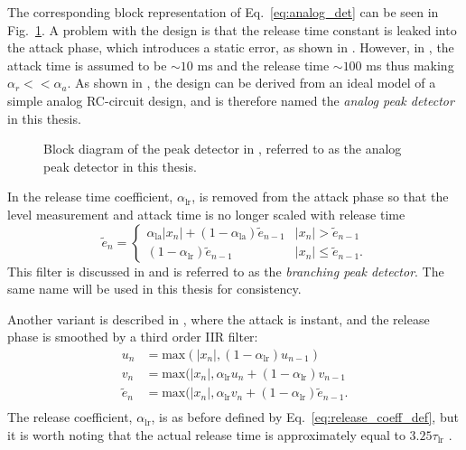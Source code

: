 \documentclass[../main2.tex]{subfiles}
\providecommand{\rootdir}{..}
\begin{document}
The corresponding block representation of Eq.~\eqref{eq:analog_det} can be seen in Fig.~\ref{fig:block_mcnally_theory_peak}. A problem with the design is that the release time constant is leaked into the attack phase, which introduces a static error, as shown in \cite{reiss2012tutorial}. However, in \cite{mcnally1984dynamic}, the attack time is assumed to be $\sim 10$ ms and the release time   $\sim 100$ ms thus making $\alpha_r << \alpha_a$. As shown in \cite{reiss2012tutorial}, the design can be derived from an ideal model of a simple analog RC-circuit design, and is therefore named the \emph{analog peak detector} in this thesis.
\begin{figure}
\centerline{}
\caption{Block diagram of the peak detector in \cite{mcnally1984dynamic}, referred to as the analog peak detector in this thesis.}
\label{fig:block_mcnally_theory_peak}
\end{figure}

In \cite{zolzer2008digital} the release time coefficient, $\alpha_\text{lr}$, is removed from the attack phase so that the level measurement and attack time is no longer scaled with release time
\begin{equation}
\tilde{e}_n = \begin{cases}
    \alpha_\text{la} |x_n| + (1-\alpha_\text{la}) \tilde{e}_{n-1} 	& |x_n| > \tilde{e}_{n-1} \\
    (1-\alpha_\text{lr}) \tilde{e}_{n-1} 						& |x_n| \leq \tilde{e}_{n-1}.
\end{cases}
\end{equation}
This filter is discussed in \cite{reiss2012tutorial} and is referred to as the \emph{branching peak detector}. The same name will be used in this thesis for consistency.

Another variant is described in \cite{stikvoort1986digital}, where the attack is instant, and the release phase is smoothed by a third order IIR filter:
\begin{equation}\label{eq:stikvoort_release}
\begin{split}
u_n &= \text{max}(|x_n|, (1-\alpha_\text{lr}) u_{n-1}) \\
v_n &= \text{max}(|x_n|, \alpha_\text{lr} u_n + (1-\alpha_\text{lr}) v_{n-1} \\
\tilde{e}_n &= \text{max}(|x_n|, \alpha_\text{lr} v_n + (1-\alpha_\text{lr}) \tilde{e}_{n-1}. \\
\end{split}
\end{equation}
The release coefficient, $\alpha_\text{lr}$, is as before defined by Eq.~\eqref{eq:release_coeff_def}, but it is worth noting that the actual release time is approximately equal to $ 3.25 \tau_\text{lr}$ \cite{stikvoort1986digital}.
\end{document}
